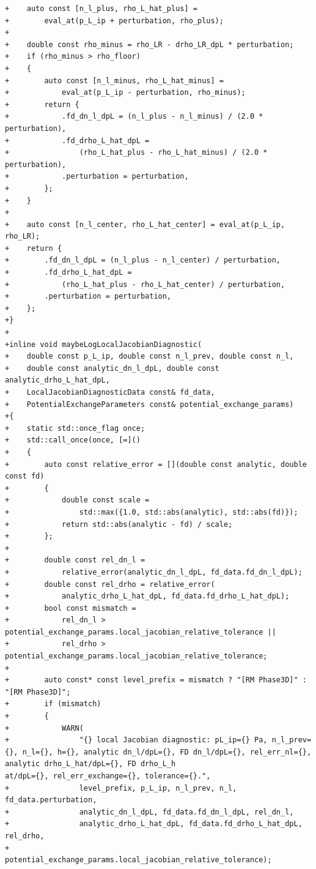 \documentclass[10pt]{article}
\begin{document}
\begin{lstlisting}
+    auto const [n_l_plus, rho_L_hat_plus] =
+        eval_at(p_L_ip + perturbation, rho_plus);
+
+    double const rho_minus = rho_LR - drho_LR_dpL * perturbation;
+    if (rho_minus > rho_floor)
+    {
+        auto const [n_l_minus, rho_L_hat_minus] =
+            eval_at(p_L_ip - perturbation, rho_minus);
+        return {
+            .fd_dn_l_dpL = (n_l_plus - n_l_minus) / (2.0 * perturbation),
+            .fd_drho_L_hat_dpL =
+                (rho_L_hat_plus - rho_L_hat_minus) / (2.0 * perturbation),
+            .perturbation = perturbation,
+        };
+    }
+
+    auto const [n_l_center, rho_L_hat_center] = eval_at(p_L_ip, rho_LR);
+    return {
+        .fd_dn_l_dpL = (n_l_plus - n_l_center) / perturbation,
+        .fd_drho_L_hat_dpL =
+            (rho_L_hat_plus - rho_L_hat_center) / perturbation,
+        .perturbation = perturbation,
+    };
+}
+
+inline void maybeLogLocalJacobianDiagnostic(
+    double const p_L_ip, double const n_l_prev, double const n_l,
+    double const analytic_dn_l_dpL, double const analytic_drho_L_hat_dpL,
+    LocalJacobianDiagnosticData const& fd_data,
+    PotentialExchangeParameters const& potential_exchange_params)
+{
+    static std::once_flag once;
+    std::call_once(once, [=]()
+    {
+        auto const relative_error = [](double const analytic, double const fd)
+        {
+            double const scale =
+                std::max({1.0, std::abs(analytic), std::abs(fd)});
+            return std::abs(analytic - fd) / scale;
+        };
+
+        double const rel_dn_l =
+            relative_error(analytic_dn_l_dpL, fd_data.fd_dn_l_dpL);
+        double const rel_drho = relative_error(
+            analytic_drho_L_hat_dpL, fd_data.fd_drho_L_hat_dpL);
+        bool const mismatch =
+            rel_dn_l > potential_exchange_params.local_jacobian_relative_tolerance ||
+            rel_drho > potential_exchange_params.local_jacobian_relative_tolerance;
+
+        auto const* const level_prefix = mismatch ? "[RM Phase3D]" : "[RM Phase3D]";
+        if (mismatch)
+        {
+            WARN(
+                "{} local Jacobian diagnostic: pL_ip={} Pa, n_l_prev={}, n_l={}, h={}, analytic dn_l/dpL={}, FD dn_l/dpL={}, rel_err_nl={}, analytic drho_L_hat/dpL={}, FD drho_L_h
at/dpL={}, rel_err_exchange={}, tolerance={}.",
+                level_prefix, p_L_ip, n_l_prev, n_l, fd_data.perturbation,
+                analytic_dn_l_dpL, fd_data.fd_dn_l_dpL, rel_dn_l,
+                analytic_drho_L_hat_dpL, fd_data.fd_drho_L_hat_dpL, rel_drho,
+                potential_exchange_params.local_jacobian_relative_tolerance);

\end{lstlisting}
\end{document}
